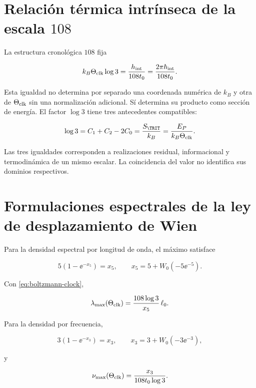 \section{Relaci\'on t\'ermica intr\'inseca de la escala \(108\)}

La estructura cronol\'ogica \(108\) fija

\begin{equation}
k_B\Theta_{\rm clk}\log3
=\frac{h_{\rm int}}{108t_0}
=\frac{2\pi\hbar_{\rm int}}{108t_0}.
\label{eq:boltzmann-clock}
\end{equation}

Esta igualdad no determina por separado una coordenada num\'erica de \(k_B\) y otra de \(\Theta_{\rm clk}\) sin una normalizaci\'on adicional. S\'i determina su producto como secci\'on de energ\'ia. El factor \(\log3\) tiene tres antecedentes compatibles:

\begin{equation}
\log3=C_1+C_2-2C_0
=\frac{S_{\TRIT}}{k_B}
=\frac{E_P}{k_B\Theta_{\rm clk}}.
\label{eq:log3-triple}
\end{equation}

Las tres igualdades corresponden a realizaciones residual, informacional y
termodin\'amica de un mismo escalar. La coincidencia del valor no identifica
sus dominios respectivos.

\section{Formulaciones espectrales de la ley de desplazamiento de Wien}

Para la densidad espectral por longitud de onda, el m\'aximo satisface

\[
5(1-\ee^{-x_5})=x_5,
\qquad
x_5=5+W_0(-5\ee^{-5}).
\]

Con \cref{eq:boltzmann-clock},

\begin{equation}
\lambda_{\max}(\Theta_{\rm clk})
=\frac{108\log3}{x_5}\,\ell_0.
\label{eq:wien-lambda}
\end{equation}

Para la densidad por frecuencia,

\[
3(1-\ee^{-x_3})=x_3,
\qquad
x_3=3+W_0(-3\ee^{-3}),
\]

y

\begin{equation}
\nu_{\max}(\Theta_{\rm clk})
=\frac{x_3}{108t_0\log3}.
\label{eq:wien-frequency}
\end{equation}

